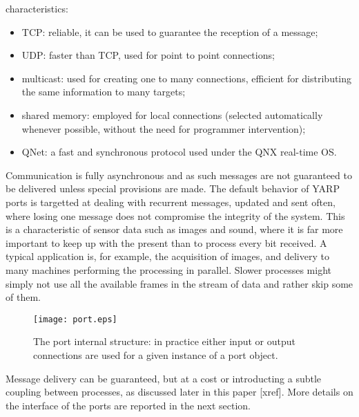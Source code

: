 characteristics:
\begin{itemize} \pflist
	\item TCP: reliable, it can be used to guarantee the reception of a message;
	\item UDP: faster than TCP, used for point to point connections;
	\item multicast: used for creating one to many connections, efficient for distributing
	the same information to many targets;
	\item shared memory: employed for local connections (selected automatically whenever possible, without the need for programmer intervention);
	\item QNet: a fast and synchronous protocol used under the QNX real-time OS.
\end{itemize}

Communication is fully asynchronous and as such messages are not guaranteed to be 
delivered unless special provisions are made. The default behavior of YARP ports 
is targetted at dealing with recurrent messages, updated and sent often, where losing 
one message does not compromise the integrity of the system. This is a characteristic
of sensor data such as images and sound, where it is far more important to keep
up with the present than to process every bit received.  
%
%
A typical application is, for example, the acquisition of images, and delivery to many 
machines performing the processing in parallel. Slower processes might simply not
use all the available frames in the stream of data and rather skip some of them.

\begin{figure}
	\centering
		\texttt{[image: port.eps]}
	\caption{The port internal structure: in practice either input or output connections
	are used for a given instance of a port object.}
	\label{fig:port}
\end{figure}


Message delivery can be guaranteed, but at a cost or introducting a subtle coupling
between processes, as discussed later in this paper [xref]. More details on the interface
of the ports are reported in the next section.

